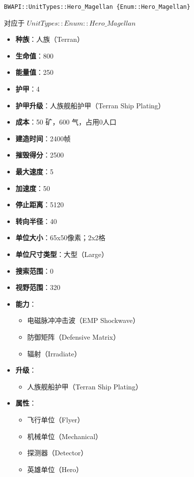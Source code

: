 \begin{tcolorbox}[colback=white, colframe=black!60!white, title=Hero\_Magellan(), arc=0mm]
    \begin{verbatim}
BWAPI::UnitTypes::Hero_Magellan {Enum::Hero_Magellan}
    \end{verbatim}
    对应于  $ UnitTypes::Enum::Hero\_Magellan $ 
    \begin{itemize}
        \item \textbf{种族}：人族（Terran）
        \item \textbf{生命值}：800
        \item \textbf{能量值}：250
        \item \textbf{护甲}：4
        \item \textbf{护甲升级}：人族舰船护甲（Terran Ship Plating）
        \item \textbf{成本}：50 矿，600 气，占用0人口
        \item \textbf{建造时间}：2400帧
        \item \textbf{摧毁得分}：2500
        \item \textbf{最大速度}：5
        \item \textbf{加速度}：50
        \item \textbf{停止距离}：5120
        \item \textbf{转向半径}：40
        \item \textbf{单位大小}：65x50像素；2x2格
        \item \textbf{单位尺寸类型}：大型（Large）
        \item \textbf{搜索范围}：0
        \item \textbf{视野范围}：320
        \item \textbf{能力}：
            \begin{itemize}
                \item 电磁脉冲冲击波（EMP Shockwave）
                \item 防御矩阵（Defensive Matrix）
                \item 辐射（Irradiate）
            \end{itemize}
        \item \textbf{升级}：
            \begin{itemize}
                \item 人族舰船护甲（Terran Ship Plating）
            \end{itemize}
        \item \textbf{属性}：
            \begin{itemize}
                \item 飞行单位（Flyer）
                \item 机械单位（Mechanical）
                \item 探测器（Detector）
                \item 英雄单位（Hero）
            \end{itemize}
    \end{itemize}
\end{tcolorbox}

